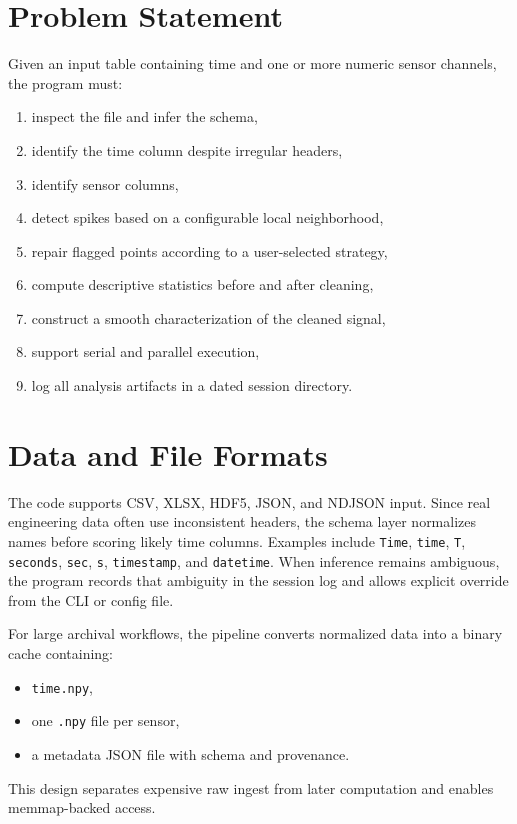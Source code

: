 \documentclass[11pt]{article}
\begin{document}
\section{Problem Statement}
Given an input table containing time and one or more numeric sensor channels, the program must:
\begin{enumerate}[label=\arabic*.]
  \item inspect the file and infer the schema,
  \item identify the time column despite irregular headers,
  \item identify sensor columns,
  \item detect spikes based on a configurable local neighborhood,
  \item repair flagged points according to a user-selected strategy,
  \item compute descriptive statistics before and after cleaning,
  \item construct a smooth characterization of the cleaned signal,
  \item support serial and parallel execution,
  \item log all analysis artifacts in a dated session directory.
\end{enumerate}

\section{Data and File Formats}
The code supports CSV, XLSX, HDF5, JSON, and NDJSON input. Since real engineering data often use inconsistent headers, the schema layer normalizes names before scoring likely time columns. Examples include \texttt{Time}, \texttt{time}, \texttt{T}, \texttt{seconds}, \texttt{sec}, \texttt{s}, \texttt{timestamp}, and \texttt{datetime}. When inference remains ambiguous, the program records that ambiguity in the session log and allows explicit override from the CLI or config file.

For large archival workflows, the pipeline converts normalized data into a binary cache containing:
\begin{itemize}
  \item \texttt{time.npy},
  \item one \texttt{.npy} file per sensor,
  \item a metadata JSON file with schema and provenance.
\end{itemize}
This design separates expensive raw ingest from later computation and enables memmap-backed access.
\end{document}

